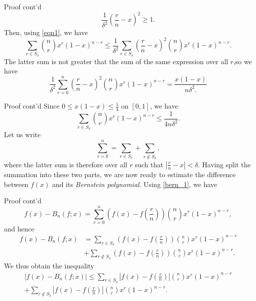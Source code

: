 \documentclass{beamer}
\begin{document}
\begin{frame}{Proof cont'd}
     \begin{equation}
   \label{eqn1}
       \frac{1}{\delta^2}\left(\frac{r}{n}-x\right)^2\geq1.
   \end{equation}
   Then, using \eqref{eqn1}, we have 
   \begin{equation*}
       \sum_{r \in S_\delta}\binom{n}{r}x^r(1-x)^{n-r}\leq\frac{1}{\delta^2}\sum_{r\in S_\delta}\left(\frac{r}{n}-x\right)^2\binom{n}{r}x^r(1-x)^{n-r}.
   \end{equation*}
   The latter sum is not greater that the sum of the same expression over all $r$,so we have 
   \begin{equation*}
       \frac{1}{\delta^2}\sum_{r=0}^n\left(\frac{r}{n}-x\right)^2\binom{n}{r}x^r(1-x)^{n-r} = \frac{x(1-x)}{n\delta^2.}
   \end{equation*}
\end{frame}
\begin{frame}{Proof cont'd}
    Since $0\leq x(1-x) \leq \frac{1}{4}$ on $[0, 1]$, we have
   \begin{equation}
       \sum_{r \in S_\delta}\binom{n}{r}x^r(1-x)^{n-r} \leq \frac{1}{4n\delta^2}.
       \label{eqn4}
   \end{equation}
   Let us write
   \begin{equation*}
       \sum_{r=0}^n = \sum_{r \in S_\delta} + \sum_{r\notin S_\delta},
   \end{equation*}
   where the latter sum is therefore over all $r$ such that $|\frac{r}{n}-x| < \delta$. Having split the summation into these two parts, we are now ready to estimate the difference between $f(x)$ and its \textit{Bernstein polynomial}. Using \eqref{bern_1}, we have
\end{frame}
\begin{frame}{Proof cont'd}
     \begin{equation*}
       f(x) - B_n(f;x) = \sum_{r=0}^n\left(f(x)-f\left(\frac{r}{n}\right)\right)\binom{n}{r}x^r(1-x)^{n-r},
   \end{equation*}
   and hence
   \begin{align*}
       f(x) - B_n(f;x)
       &=\sum_{r\in S_\delta}\left(f(x)-f\left(\frac{r}{n}\right)\right)\binom{n}{r}x^r(1-x)^{n-r}\\
       &+\sum_{r\notin S_\delta}\left(f(x)-f\left(\frac{r}{n}\right)\right)\binom{n}{r}x^r(1-x)^{n-r}.
   \end{align*}
   We thus obtain the inequality
   \begin{align*}
       \vert f(x)-B_n(f;x) \vert \leq \sum_{r\in S_\delta}\left |f(x)-f\left(\frac{r}{n}\right)\right|\binom{n}{r}x^r(1-x)^{n-r}\\+ \sum_{r \notin S_\delta}\left |f(x)-f\left(\frac{r}{n}\right)\right|\binom{n}{r}x^r(1-x)^{n-r}.
   \end{align*}
\end{frame}
\end{document}

